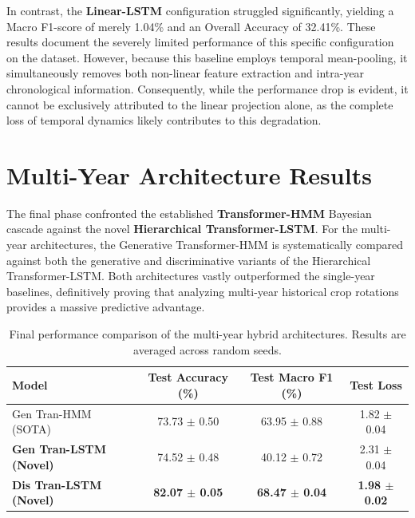 In contrast, the \textbf{Linear-LSTM} configuration struggled significantly, yielding a Macro F1-score of merely 1.04\% and an Overall Accuracy of 32.41\%.
These results document the severely limited performance of this specific configuration on the dataset.
However, because this baseline employs temporal mean-pooling, it simultaneously removes both
non-linear feature extraction and intra-year chronological information.
Consequently, while the performance drop is evident, it cannot be exclusively attributed to the linear projection alone,
as the complete loss of temporal dynamics likely contributes to this degradation.

\section{Multi-Year Architecture Results}
\label{sec:hybrid_results}

The final phase confronted the established \textbf{Transformer-HMM} Bayesian cascade against the novel \textbf{Hierarchical Transformer-LSTM}.
For the multi-year architectures, the Generative Transformer-HMM is systematically compared against both the generative
and discriminative variants of the Hierarchical Transformer-LSTM.
Both architectures vastly outperformed the single-year baselines, definitively proving that analyzing multi-year historical crop
rotations provides a massive predictive advantage.

\begin{table}[htpb]
    \centering
    \renewcommand{\arraystretch}{1.2}
    \begin{tabular}{lccc}
        \toprule
        \textbf{Model} & \textbf{Test Accuracy (\%)} & \textbf{Test Macro F1 (\%)} & \textbf{Test Loss} \\
        \midrule
        Gen Tran-HMM (SOTA) & 73.73 $\pm$ 0.50 & 63.95 $\pm$ 0.88 & 1.82 $\pm$ 0.04 \\
        \midrule
        \textbf{Gen Tran-LSTM (Novel)} & 74.52 $\pm$ 0.48 & 40.12 $\pm$ 0.72 & 2.31 $\pm$ 0.04 \\
        \textbf{Dis Tran-LSTM (Novel)} & \textbf{82.07 $\pm$ 0.05} & \textbf{68.47 $\pm$ 0.04} & \textbf{1.98 $\pm$ 0.02} \\
        \bottomrule
    \end{tabular}
    \caption{Final performance comparison of the multi-year hybrid architectures. Results are averaged across random seeds.}
    \label{tab:hybrid_comparison}
\end{table}

